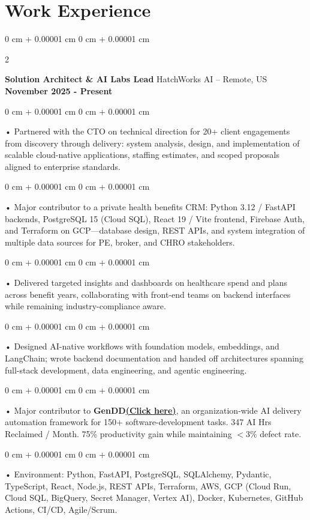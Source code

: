 \documentclass[10pt, letterpaper]{article}
\newenvironment{onecolentry}{
    \begin{adjustwidth}{
        0 cm + 0.00001 cm
    }{
        0 cm + 0.00001 cm
    }
}{
    \end{adjustwidth}
} %
\newenvironment{twocolentry}[2][]{
    \onecolentry
    \def\secondColumn{#2}
    \setcolumnwidth{\fill, 4.5 cm}
    \begin{paracol}{2}
}{
    \switchcolumn \raggedleft \secondColumn
    \end{paracol}
    \endonecolentry
} %
\begin{document}
    \vspace{0.5cm}
    \section{Work Experience}
        \vspace{0.1cm}

        \begin{twocolentry}{
            \textbf{November 2025 - Present}
        }
            \textbf{Solution Architect \& AI Labs Lead} HatchWorks AI -- Remote, US\end{twocolentry}

        \begin{onecolentry}
             • Partnered with the CTO on technical direction for 20+ client engagements from discovery through delivery: system analysis, design, and implementation of scalable cloud-native applications, staffing estimates, and scoped proposals aligned to enterprise standards.
        \end{onecolentry}
        \begin{onecolentry}
             • Major contributor to a private health benefits CRM: Python 3.12 / FastAPI backends, PostgreSQL 15 (Cloud SQL), React 19 / Vite frontend, Firebase Auth, and Terraform on GCP---database design, REST APIs, and system integration of multiple data sources for PE, broker, and CHRO stakeholders.
        \end{onecolentry}
        \begin{onecolentry}
             • Delivered targeted insights and dashboards on healthcare spend and plans across benefit years, collaborating with front-end teams on backend interfaces while remaining industry-compliance aware.
        \end{onecolentry}
        \begin{onecolentry}
             • Designed AI-native workflows with foundation models, embeddings, and LangChain; wrote backend documentation and handed off architectures spanning full-stack development, data engineering, and agentic engineering.
        \end{onecolentry}
        \begin{onecolentry}
             • Major contributor to \textbf{GenDD}\href{https://hatchworks.com/generative-driven-development/}{\textbf{(Click here)}}, an organization-wide AI delivery automation framework for 150+ software-development tasks. 347 AI Hrs Reclaimed / Month. 75\% productivity gain while maintaining $<$3\% defect rate.
        \end{onecolentry}
        \begin{onecolentry}
             • Environment: Python, FastAPI, PostgreSQL, SQLAlchemy, Pydantic, TypeScript, React, Node.js, REST APIs, Terraform, AWS, GCP (Cloud Run, Cloud SQL, BigQuery, Secret Manager, Vertex AI), Docker, Kubernetes, GitHub Actions, CI/CD, Agile/Scrum.
        \end{onecolentry}
\end{document}
